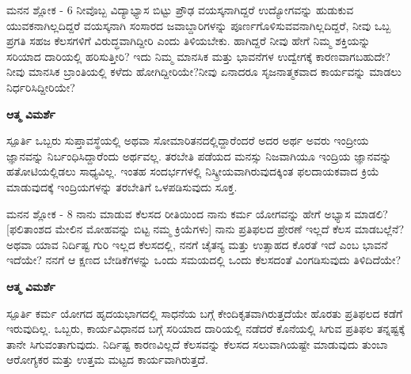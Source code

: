 \newpage
\begin{mananam}{\mananamfont ಮನನ ಶ್ಲೋಕ - \textenglish{6}}
\footnotesize \mananamtext ನೀವೊಬ್ಬ ವಿದ್ಯಾಭ್ಯಾಸ ಬಿಟ್ಟು ಪ್ರೌಢ ವಯಸ್ಕನಾಗಿದ್ದರೆ ಉದ್ಯೋಗವನ್ನು ಹುಡುಕುವ ಯುವಕನಾಗಿಲ್ಲದಿದ್ದರೆ ವಯಸ್ಕನಾಗಿ ಸಂಸಾರದ ಜವಾಬ್ದಾರಿಗಳನ್ನು ಪೂರ್ಣಗೊಳಿಸುವವನಾಗಿಲ್ಲದಿದ್ದರೆ, ನೀವು ಒಬ್ಬ ಪ್ರಗತಿ ಸಹಜ ಕೆಲಸಗಳಿಗೆ ವಿರುದ್ಧವಾಗಿದ್ದೀರಿ ಎಂದು ತಿಳಿಯಬೇಕು. ಹಾಗಿದ್ದರೆ ನೀವು ಹೇಗೆ ನಿಮ್ಮ ಶಕ್ತಿಯನ್ನು ಸರಿಯಾದ ದಾರಿಯಲ್ಲಿ ಹರಿಸುತ್ತೀರಿ? ಇದು ನಿಮ್ಮ ಮಾನಸಿಕ ಮತ್ತು ಭಾವನೆಗಳ ಉದ್ವೇಗಕ್ಕೆ ಕಾರಣವಾಗಬಹುದೇ? ನೀವು ಮಾನಸಿಕ ಬ್ರಾಂತಿಯಲ್ಲಿ ಕಳೆದು ಹೋಗಿದ್ದೀರಿಯೇ?ನೀವು ಏನಾದರೂ ಸೃಜನಾತ್ಮಕವಾದ
ಕಾರ್ಯವನ್ನು ಮಾಡಲು ನಿರ್ಧರಿಸಿದ್ದೀರಿಯೇ?
\end{mananam}
\WritingHand\enspace\textbf{ಆತ್ಮ ವಿಮರ್ಶೆ}\\
\begin{inspiration}{\mananamfont ಸ್ಪೂರ್ತಿ}
\footnotesize \mananamtext ಒಬ್ಬರು ಸುಪ್ತಾವಸ್ಥೆಯಲ್ಲಿ ಅಥವಾ ಸೋಮಾರಿತನದಲ್ಲಿದ್ದಾರೆಂದರೆ ಅದರ ಅರ್ಥ ಅವರು ಇಂದ್ರೀಯ ಜ್ಞಾನವನ್ನು ನಿರ್ಬಂಧಿಸಿದ್ದಾರೆಂದು ಅರ್ಥವಲ್ಲ. ತರಬೇತಿ ಪಡೆಯದ ಮನಸ್ಸು ನಿಜವಾಗಿಯೂ ಇಂದ್ರಿಯ ಜ್ಞಾನವನ್ನು ಹತೋಟಿಯಲ್ಲಿಡಲು ಸಾಧ್ಯವಿಲ್ಲ. ಇಂತಹ ಸಂದರ್ಭಗಳಲ್ಲಿ ನಿಸ್ಕ್ರೀಯವಾಗಿರುವುದಕ್ಕಿಂತ ಫಲದಾಯಕವಾದ ಕ್ರಿಯೆ ಮಾಡುವುದಕ್ಕೆ ಇಂದ್ರಿಯಗಳನ್ನು ತರಬೇತಿಗೆ ಒಳಪಡಿಸುವುದು ಸೂಕ್ತ.
\end{inspiration}
\newpage

\begin{mananam}{\mananamfont ಮನನ ಶ್ಲೋಕ - \textenglish{8}}
\footnotesize \mananamtext ನಾನು ಮಾಡುವ ಕೆಲಸದ ರೀತಿಯಿಂದ ನಾನು ಕರ್ಮ ಯೋಗವನ್ನು ಹೇಗೆ ಅಭ್ಯಾಸ ಮಾಡಲಿ? [ಫಲಿತಾಂಶದ ಮೇಲಿನ ಮೋಹವನ್ನು ಬಿಟ್ಟ ನಮ್ಮ ಕ್ರಿಯೆಗಳು] ನಾನು ಪ್ರತಿಫಲದ ಪ್ರೇರಣೆ ಇಲ್ಲದೆ ಕೆಲಸ ಮಾಡಬಲ್ಲೆನೆ? ಅಥವಾ ಯಾವ ನಿರ್ದಿಷ್ಟ ಗುರಿ ಇಲ್ಲದ ಕೆಲಸದಲ್ಲಿ, ನನಗೆ ಚೈತನ್ಯ ಮತ್ತು ಉತ್ಸಾಹದ ಕೊರತೆ ಇದೆ ಎಂಬ ಭಾವನೆ ಇದೆಯೇ? ನನಗೆ ಆ ಕ್ಷಣದ ಬೇಡಿಕೆಗಳನ್ನು ಒಂದು ಸಮಯದಲ್ಲಿ ಒಂದು ಕೆಲಸದಂತೆ ವಿಂಗಡಿಸುವುದು ತಿಳಿದಿದೆಯೇ?
\end{mananam}
\WritingHand\enspace\textbf{ಆತ್ಮ ವಿಮರ್ಶೆ}\\
\begin{inspiration}{\mananamfont ಸ್ಪೂರ್ತಿ}
\footnotesize \mananamtext ಕರ್ಮ ಯೋಗದ ಹೃದಯಭಾಗದಲ್ಲಿ ಸಾಧನೆಯ ಬಗ್ಗೆ ಕೇಂದಿಕೃತವಾಗಿರುತ್ತದೆಯೇ ಹೊರತು ಪ್ರತಿಫಲದ ಕಡೆಗೆ ಇರುವುದಿಲ್ಲ. ಒಬ್ಬರು, ಕಾರ್ಯವಿಧಾನದ ಬಗ್ಗೆ ಸರಿಯಾದ ದಾರಿಯಲ್ಲಿ ನಡೆದರೆ ಕೊನೆಯಲ್ಲಿ ಸಿಗುವ ಪ್ರತಿಫಲ ತನ್ನಷ್ಟಕ್ಕೆ ತಾನೇ ಸಿಗುವಂತಾಗುವುದು. ನಿರ್ದಿಷ್ಟ ಕಾರಣವಿಲ್ಲದೆ ಕೆಲಸವನ್ನು ಕೆಲಸದ ಸಲುವಾಗಿಯಷ್ಟೇ ಮಾಡುವುದು ತುಂಬಾ ಆರೋಗ್ಯಕರ ಮತ್ತು ಉತ್ತಮ ಮಟ್ಟದ ಕಾರ್ಯವಾಗಿರುತ್ತದೆ.
\end{inspiration}
\newpage

